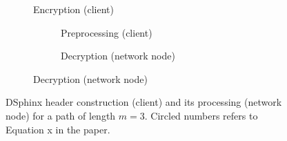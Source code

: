 \begin{figure}
    \centering
    \begin{minipage}{0.49\linewidth}
        \begin{algorithm}[H]
        \small
        
        \label{algo:preprocessing}
        \end{algorithm}
    \end{minipage}
    \hfill
    \begin{minipage}{0.49\linewidth}
        \begin{algorithm}[H]
        \small
        
        \label{algo:encryption}
        \end{algorithm}
    \end{minipage}
\end{figure}


\begin{figure}
    \centering
    \begin{subfigure}[b]{0.48\linewidth}
        \setcounter{subfigure}{1} %
        \resizebox{\linewidth}{!}{}
        \caption{Encryption (client)}
        \label{fig:chunk-encryption}
    \end{subfigure}
    \hfill
    \begin{subfigure}[b]{0.48\linewidth}

        \begin{subfigure}[t]{\linewidth}
            \setcounter{subfigure}{0} %
            \centering
            \resizebox{\linewidth}{!}{}
            \caption{Preprocessing (client)}
            \label{fig:chunk-preprocessing}
        \end{subfigure}

        \vspace{1.em}

        \begin{subfigure}[b]{\linewidth}
            \setcounter{subfigure}{2} %
            \centering
            \resizebox{\linewidth}{!}{}
            \caption{Decryption (network node)}
            \label{fig:chunk-decryption}
        \end{subfigure}

    \end{subfigure}

    \caption{DSphinx header construction (client) and its processing (network node) for a path of length $m=3$. Circled numbers  refers to Equation x in the paper.}
    \label{fig:chunkwise-overview}
\end{figure}


